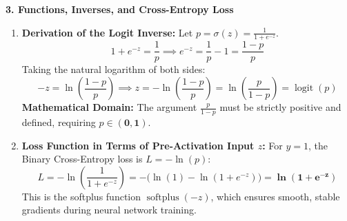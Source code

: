 \textbf{3. Functions, Inverses, and Cross-Entropy Loss}
\begin{enumerate}
    \item \textbf{Derivation of the Logit Inverse:}
    Let $p = \sigma(z) = \frac{1}{1 + e^{-z}}$.
    \begin{equation*}
    1 + e^{-z} = \frac{1}{p} \implies e^{-z} = \frac{1}{p} - 1 = \frac{1 - p}{p}
    \end{equation*}
    Taking the natural logarithm of both sides:
    \begin{equation*}
    -z = \ln\left(\frac{1 - p}{p}\right) \implies z = -\ln\left(\frac{1 - p}{p}\right) = \ln\left(\frac{p}{1 - p}\right) = \operatorname{logit}(p)
    \end{equation*}
    \textbf{Mathematical Domain:} The argument $\frac{p}{1 - p}$ must be strictly positive and defined, requiring $p \in \mathbf{(0, 1)}$.
    \item \textbf{Loss Function in Terms of Pre-Activation Input $z$:}
    For $y = 1$, the Binary Cross-Entropy loss is $L = -\ln(p)$:
    \begin{equation*}
    L = -\ln\left(\frac{1}{1 + e^{-z}}\right) = -\Big( \ln(1) - \ln(1 + e^{-z}) \Big) = \mathbf{\ln(1 + e^{-z})}
    \end{equation*}
    This is the softplus function $\operatorname{softplus}(-z)$, which ensures smooth, stable gradients during neural network training.
\end{enumerate}

